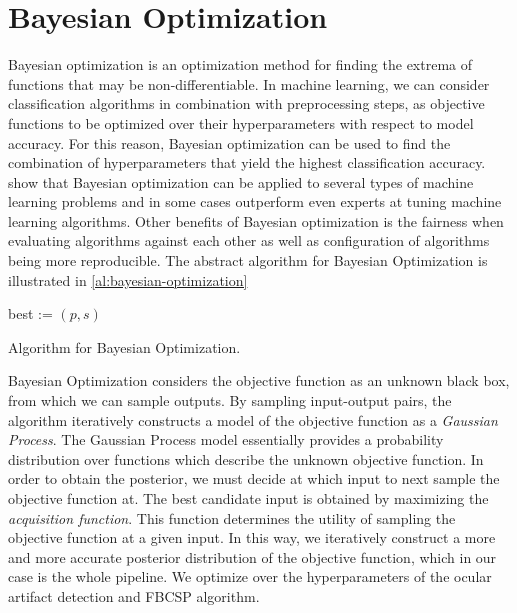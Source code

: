 \section{Bayesian Optimization}\label{sec:bayesian-optimization}
Bayesian optimization is an optimization method for finding the extrema of functions that may be non-differentiable. In machine learning, we can consider classification algorithms in combination with preprocessing steps, as objective functions to be optimized over their hyperparameters with respect to model accuracy. For this reason, Bayesian optimization can be used to find the combination of hyperparameters that yield the highest classification accuracy. \citet{snoek2012practical} show that Bayesian optimization can be applied to several types of machine learning problems and in some cases outperform even experts at tuning machine learning algorithms. Other benefits of Bayesian optimization is the fairness when evaluating algorithms against each other as well as configuration of algorithms being more reproducible.
The abstract algorithm for Bayesian Optimization is illustrated in \cref{al:bayesian-optimization}
\begin{algorithm*}
\DontPrintSemicolon
	best := $(p, s)$   
	\caption{Algorithm for Bayesian Optimization.}
	\label{al:bayesian-optimization}
\end{algorithm*}

Bayesian Optimization considers the objective function as an unknown black box, from which we can sample outputs. By sampling input-output pairs, the algorithm iteratively constructs a model of the objective function as a \emph{Gaussian Process}. The Gaussian Process model essentially provides a probability distribution over functions which describe the unknown objective function. In order to obtain the posterior, we must decide at which input to next sample the objective function at. The best candidate input is obtained by maximizing the \emph{acquisition function}. This function determines the utility of sampling the objective function at a given input. In this way, we iteratively construct a more and more accurate posterior distribution of the objective function, which in our case is the whole pipeline. We optimize over the hyperparameters of the ocular artifact detection and FBCSP algorithm.

